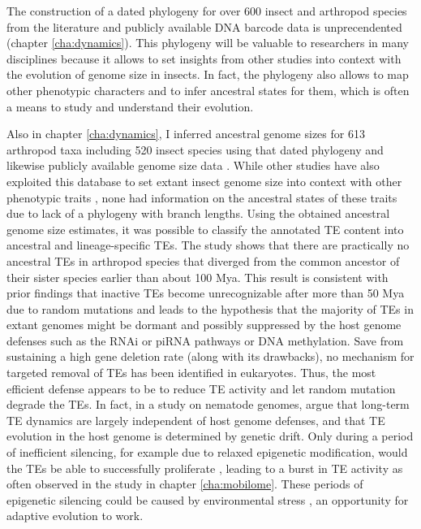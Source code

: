 The construction of a dated phylogeny for over 600 insect and arthropod
species from the literature and publicly available DNA barcode data is
unprecendented (chapter \ref{cha:dynamics}). This phylogeny will be
valuable to researchers in many disciplines because it allows to set
insights from other studies into context with the evolution of genome
size in insects.  In fact, the phylogeny also allows to map other
phenotypic characters and to infer ancestral states for them, which is
often a means to study and understand their evolution.

Also in chapter \ref{cha:dynamics}, I inferred ancestral genome sizes
for 613 arthropod taxa including 520 insect species using that dated
phylogeny and likewise publicly available genome size data
\citep{Gregory2018}. While other studies have also exploited this
database to set extant insect genome size into context with other
phenotypic traits \citep{Alfsnes2017, Gregory2011}, none had information
on the ancestral states of these traits due to lack of a phylogeny with
branch lengths. Using the obtained ancestral genome size estimates, it
was possible to classify the annotated TE content into ancestral and
lineage-specific TEs. The study shows that there are practically no
ancestral TEs in arthropod species that diverged from the common
ancestor of their sister species earlier than about 100 Mya. This result
is consistent with prior findings that inactive TEs become
unrecognizable after more than 50 Mya due to random mutations
\citep{Shedlock2000} and leads to the hypothesis that the majority of
TEs in extant genomes might be dormant and possibly suppressed by the
host genome defenses such as the RNAi or piRNA pathways or DNA
methylation. Save from sustaining a high gene deletion rate (along with
its drawbacks), no mechanism for targeted removal of TEs has been
identified in eukaryotes. Thus, the most efficient defense appears to be
to reduce TE activity and let random mutation degrade the TEs. In fact,
in a study on nematode genomes, \citet{Szitenberg2016} argue that
long-term TE dynamics are largely independent of host genome defenses,
and that TE evolution in the host genome is determined by genetic drift.
Only during a period of inefficient silencing, for example due to
relaxed epigenetic modification, would the TEs be able to successfully
proliferate \citep{Slotkin2007, Zeh2009, Rebollo2010}, leading to a
burst in TE activity as often observed in the study in chapter
\ref{cha:mobilome}.  These periods of epigenetic silencing could be
caused by environmental stress \citep{Horvath2017a}, an opportunity for
adaptive evolution to work.

